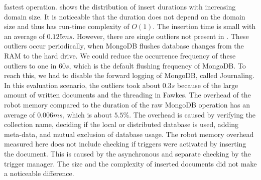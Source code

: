 fastest operation.
 shows the distribution of
insert durations with increasing domain size. It is noticeable that the
duration does not depend on the domain size and thus has run-time
complexity of $O(1)$. The insertion time is small with an average of
$0.125ms$. However, there are single outliers not present in
. These outliers occur periodically, when
MongoDB flushes database changes from the RAM to the hard drive. We
could reduce the occurrence frequency of these outliers to one in $60s$, which is the
default flushing frequency of MongoDB. To reach this, we had to
disable the forward logging of MongoDB, called Journaling. In this
evaluation scenario, the outliers took about $0.3s$ because of the
large amount of written documents and the threading in Fawkes.  The
overhead of the robot memory compared to the duration of the raw
MongoDB operation has an average of $0.006ms$, which is about $5.5\%$.
The overhead is caused by verifying the collection name, deciding if
the local or distributed database is used, adding meta-data, and
mutual exclusion of database usage. The robot memory overhead measured
here does not include checking if triggers were activated by inserting
the document. This is caused by the asynchronous and separate checking by
the trigger manager. The size and the complexity of inserted
documents did not make a noticeable difference.

